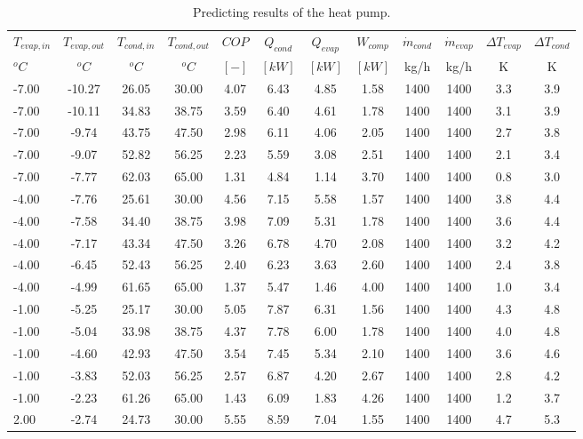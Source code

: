 \documentclass[english]{SPFShortReport}
\begin{document}
\begin{table}[!ht]
\begin{small}
\caption{Predicting results of the heat pump.}
\begin{center}
\resizebox{12cm}{!} 
{
\begin{tabular}{l | c c c c c c c c c c c } 
\hline
\hline
$T_{evap,in}$ &$T_{evap,out}$ &$T_{cond,in}$ &$T_{cond,out}$ &$COP$ &$Q_{cond}$ &$Q_{evap}$ &$W_{comp}$ &$\dot m_{cond}$ &$\dot m_{evap}$ &$\Delta T_{evap}$ &$\Delta T_{cond}$ \\ 
$^oC$ &$^oC$ &$^oC$ &$^oC$ &$[-]$ &$[kW]$ &$[kW]$ &$[kW]$ &kg/h &kg/h &K &K\\ 
\hline
-7.00 & -10.27 & 26.05 & 30.00 & 4.07 & 6.43 & 4.85 & 1.58 & 1400 & 1400 & 3.3 & 3.9\\ 
-7.00 & -10.11 & 34.83 & 38.75 & 3.59 & 6.40 & 4.61 & 1.78 & 1400 & 1400 & 3.1 & 3.9\\ 
-7.00 & -9.74 & 43.75 & 47.50 & 2.98 & 6.11 & 4.06 & 2.05 & 1400 & 1400 & 2.7 & 3.8\\ 
-7.00 & -9.07 & 52.82 & 56.25 & 2.23 & 5.59 & 3.08 & 2.51 & 1400 & 1400 & 2.1 & 3.4\\ 
-7.00 & -7.77 & 62.03 & 65.00 & 1.31 & 4.84 & 1.14 & 3.70 & 1400 & 1400 & 0.8 & 3.0\\ 
-4.00 & -7.76 & 25.61 & 30.00 & 4.56 & 7.15 & 5.58 & 1.57 & 1400 & 1400 & 3.8 & 4.4\\ 
-4.00 & -7.58 & 34.40 & 38.75 & 3.98 & 7.09 & 5.31 & 1.78 & 1400 & 1400 & 3.6 & 4.4\\ 
-4.00 & -7.17 & 43.34 & 47.50 & 3.26 & 6.78 & 4.70 & 2.08 & 1400 & 1400 & 3.2 & 4.2\\ 
-4.00 & -6.45 & 52.43 & 56.25 & 2.40 & 6.23 & 3.63 & 2.60 & 1400 & 1400 & 2.4 & 3.8\\ 
-4.00 & -4.99 & 61.65 & 65.00 & 1.37 & 5.47 & 1.46 & 4.00 & 1400 & 1400 & 1.0 & 3.4\\ 
-1.00 & -5.25 & 25.17 & 30.00 & 5.05 & 7.87 & 6.31 & 1.56 & 1400 & 1400 & 4.3 & 4.8\\ 
-1.00 & -5.04 & 33.98 & 38.75 & 4.37 & 7.78 & 6.00 & 1.78 & 1400 & 1400 & 4.0 & 4.8\\ 
-1.00 & -4.60 & 42.93 & 47.50 & 3.54 & 7.45 & 5.34 & 2.10 & 1400 & 1400 & 3.6 & 4.6\\ 
-1.00 & -3.83 & 52.03 & 56.25 & 2.57 & 6.87 & 4.20 & 2.67 & 1400 & 1400 & 2.8 & 4.2\\ 
-1.00 & -2.23 & 61.26 & 65.00 & 1.43 & 6.09 & 1.83 & 4.26 & 1400 & 1400 & 1.2 & 3.7\\ 
2.00 & -2.74 & 24.73 & 30.00 & 5.55 & 8.59 & 7.04 & 1.55 & 1400 & 1400 & 4.7 & 5.3\\ 

\end{tabular}}
\end{center}
\end{small}
\end{table}
\end{document}
